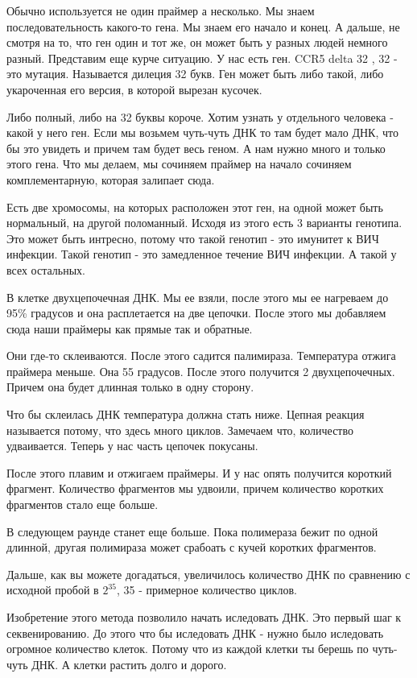 Обычно используется не один праймер а несколько. Мы знаем последовательность 
какого-то гена. Мы знаем его начало и конец. А дальше, не смотря на то, что ген один и тот же, 
он может быть у разных людей немного разный. Представим еще курче ситуацию. У нас есть ген. 
CCR5 delta 32 , 32 - это мутация. Называется дилеция 32 букв. Ген может быть либо такой, 
либо укароченная его версия, в которой вырезан кусочек. 

Либо полный, либо на 32 буквы короче. Хотим узнать у отдельного человека - какой у него ген. 
Если мы возьмем чуть-чуть ДНК то там будет мало ДНК, что бы это увидеть и причем там будет весь геном. 
А нам нужно много и только этого гена. 
Что мы делаем, мы сочиняем праймер на начало сочиняем комплементарную, которая залипает сюда. 

Есть две хромосомы, на которых расположен этот ген, на одной может быть нормальный, на другой 
поломанный. Исходя из этого есть 3 варианты генотипа. Это может быть интресно, потому что 
такой генотип - это имунитет к ВИЧ инфекции. Такой генотип - это замедленное течение 
ВИЧ инфекции. А такой у всех остальных. 
                                             
В клетке двухцепочечная ДНК. Мы ее взяли, после этого 
мы ее нагреваем до 95\% градусов и она расплетается на две цепочки. 
После этого мы добавляем сюда наши праймеры как прямые так и обратные. 

Они где-то склеиваются. После этого садится палимираза. Температура отжига 
праймера меньше. Она 55 градусов. После этого получится 2 двухцепочечных. 
Причем она будет длинная только в одну сторону. 

Что бы склеилась ДНК температура должна стать ниже. 
Цепная реакция называется потому, что здесь много циклов. Замечаем что, 
количество удваивается. Теперь 
у нас часть цепочек покусаны. 

После этого плавим и отжигаем праймеры. 
И у нас опять получится короткий фрагмент. Количество 
фрагментов мы удвоили, причем количество коротких
фрагментов стало еще больше. 

В следующем раунде станет еще больше. Пока полимераза бежит по одной длинной, 
другая полимираза может срабоать с кучей коротких фрагментов. 

Дальше, как вы можете догадаться, увеличилось количество ДНК по 
сравнению с исходной пробой в $2^{35}$, 35 - примерное количество циклов. 

Изобретение этого метода позволило начать иследовать ДНК. Это 
первый шаг к секвенированию. До этого что бы 
иследовать ДНК - нужно было иследовать 
огромное количество клеток. Потому что из 
каждой клетки ты берешь по чуть-чуть ДНК. 
А клетки растить долго и дорого. 

